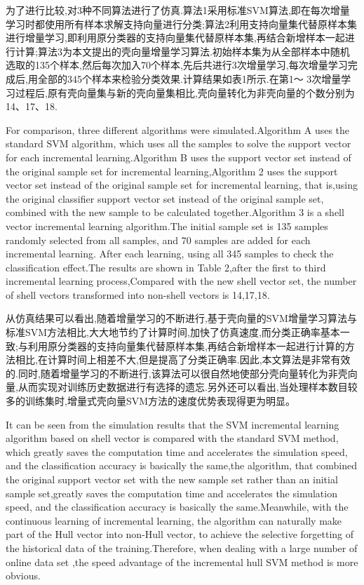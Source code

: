 \documentclass[a4paper]{article}
\begin{document}
为了进行比较,对3种不同算法进行了仿真.算法1采用标准SVM算法,即在每次增量学习时都使用所有样本求解支持向量进行分类;算法2利用支持向量集代替原样本集进行增量学习,即利用原分类器的支持向量集代替原样本集,再结合新增样本一起进行计算;算法3为本文提出的壳向量增量学习算法.初始样本集为从全部样本中随机选取的135个样本,然后每次加入70个样本,先后共进行3次增量学习,每次增量学习完成后,用全部的345个样本来检验分类效果.计算结果如表1所示.在第1～ 3次增量学习过程后,原有壳向量集与新的壳向量集相比,壳向量转化为非壳向量的个数分别为14、17、18.

For comparison, three different algorithms were simulated.Algorithm A uses the standard SVM algorithm, which uses all the samples to solve the support vector for each incremental learning.Algorithm B uses the support vector set instead of the original sample set for incremental learning,Algorithm 2 uses the support vector set instead of the original sample set for incremental learning, that is,using the original classifier support vector set instead of the original sample set, combined with the new sample to be calculated together.Algorithm 3 is a shell vector incremental learning algorithm.The initial sample set is 135 samples randomly selected from all samples, and 70 samples are added for each incremental learning. After each learning, using all 345 samples to check the classification effect.The results are shown in Table 2,after the first to third incremental learning process,Compared with the new shell vector set, the number of shell vectors transformed into non-shell vectors is 14,17,18.

从仿真结果可以看出,随着增量学习的不断进行,基于壳向量的SVM增量学习算法与标准SVM方法相比,大大地节约了计算时间,加快了仿真速度,而分类正确率基本一致;与利用原分类器的支持向量集代替原样本集,再结合新增样本一起进行计算的方法相比,在计算时间上相差不大,但是提高了分类正确率.因此,本文算法是非常有效的.同时,随着增量学习的不断进行,该算法可以很自然地使部分壳向量转化为非壳向量,从而实现对训练历史数据进行有选择的遗忘.另外还可以看出,当处理样本数目较多的训练集时,增量式壳向量SVM方法的速度优势表现得更为明显。

It can be seen from the simulation results that the SVM incremental learning algorithm based on shell vector is compared with the standard SVM method, which greatly saves the computation time and accelerates the simulation speed, and the classification accuracy is basically the same,the algorithm, that combined the original support vector set with the new sample set rather than an initial sample set,greatly saves the computation time and accelerates the simulation speed, and the classification accuracy is basically the same.Meanwhile, with the continuous learning of incremental learning, the algorithm can naturally make part of the Hull vector into non-Hull vector, to achieve the selective forgetting of the historical data of the training.Therefore, when dealing with a large number of online data set ,the speed advantage of the incremental hull SVM method is more obvious.
\end{document}
